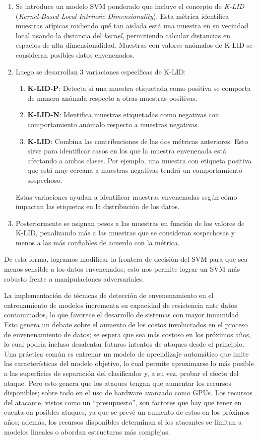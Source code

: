 \documentclass[letterpaper,12pt,oneside]{book}
\begin{document}
{{{{\begin{enumerate}
    \item Se introduce un modelo SVM ponderado que incluye el concepto de \textit{K-LID} (\textit{Kernel-Based Local Intrinsic Dimensionality}). Esta métrica identifica muestras atípicas midiendo qué tan aislada está una muestra en su vecindad local usando la distancia del \textit{kernel}, permitiendo calcular distancias en espacios de alta dimensionalidad. Muestras con valores anómalos de K-LID se consideran posibles datos envenenados.
    \item Luego se desarrollan 3 variaciones específicas de K-LID:
    \begin{enumerate}
        \item  \textbf{K-LID-P}: Detecta si una muestra etiquetada como positiva se comporta de manera anómala respecto a otras muestras positivas.
        \item \textbf{K-LID-N}: Identifica muestras etiquetadas como negativas con comportamiento anómalo respecto a muestras negativas.
        \item \textbf{K-LID}: Combina las contribuciones de las dos métricas anteriores. Esto sirve para identificar casos en los que la muestra envenenada está afectando a ambas clases. Por ejemplo, una muestra con etiqueta positiva que está muy cercana a muestras negativas tendrá un comportamiento sospechoso.   
    \end{enumerate}
    Estas variaciones ayudan a identificar muestras envenenadas según cómo impactan las etiquetas en la distribución de los datos.
    \item Posteriormente se asignan pesos a las muestras en función de los valores de K-LID, penalizando más a las muestras que se consideran sospechosas y menos a las más confiables de acuerdo con la métrica.   
\end{enumerate}
De esta forma, logramos modificar la frontera de decisión del SVM para que sea menos sensible a los datos envenenados; esto nos permite lograr un SVM más robusto frente a manipulaciones adversariales.

La implementación de técnicas de detección de envenenamiento en el entrenamiento de modelos incrementa su capacidad de resistencia ante datos contaminados, lo que favorece el desarrollo de sistemas con mayor inmunidad. Esto genera un debate sobre el aumento de los costos involucrados en el proceso de envenenamiento de datos; se espera que sea más costoso en los próximos años, lo cual podría incluso desalentar futuros intentos de ataques desde el principio. Una práctica común es entrenar un modelo de aprendizaje automático que imite las características del modelo objetivo, lo cual permite aproximarse lo más posible a las superficies de separación del clasificador y, a su vez, probar el efecto del ataque. Pero esto genera que los ataques tengan que aumentar los recursos disponibles; sobre todo en el uso de hardware avanzado como GPUs. Los recursos del atacante, vistos como un “presupuesto”, son factores que hay que tener en cuenta en posibles ataques, ya que se prevé un aumento de estos en los próximos años; además, los recursos disponibles determinan si los atacantes se limitan a modelos lineales o abordan estructuras más complejas.

}}}}
\end{document}
